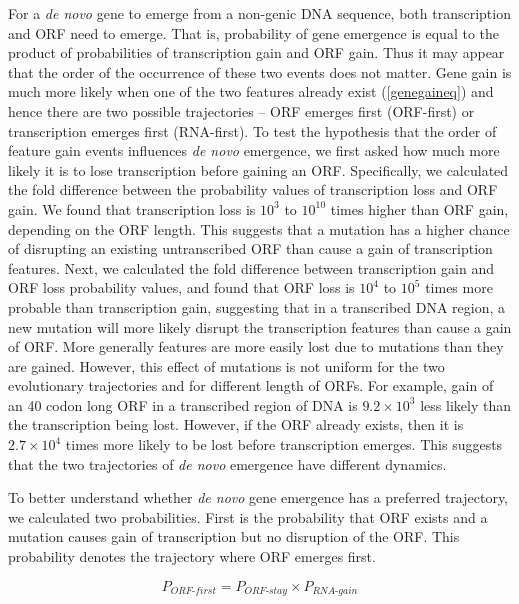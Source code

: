 \documentclass[12pt,a4paper]{article}
\begin{document}
For a \textit{de novo} gene to emerge from a non-genic DNA sequence, both transcription and ORF need to emerge. That is, probability of gene emergence is equal to the product of probabilities of transcription gain and ORF gain. Thus it may appear that the order of the occurrence of these two events does not matter. Gene gain is much more likely when one of the two features already exist (\autoref{genegaineq}) and hence there are two possible trajectories -- ORF emerges first (ORF-first) or transcription emerges first (RNA-first). To test the hypothesis that the order of feature gain events influences \textit{de novo} emergence, we first asked how much more likely it is to lose transcription before gaining an ORF. Specifically, we calculated the fold difference between the probability values of transcription loss and ORF gain. We found that transcription loss is $10^3$ to $10^{10}$ times higher than ORF gain, depending on the ORF length. This suggests that a mutation has a higher chance of disrupting an existing untranscribed ORF than cause a gain of transcription features. Next, we calculated the fold difference between transcription gain and ORF loss probability values, and found that ORF loss is $10^4$ to $10^5$ times more probable than transcription gain, suggesting that in a transcribed DNA region, a new mutation will more likely disrupt the transcription features than cause a gain of ORF. More generally features are more easily lost due to mutations than they are gained. However, this effect of mutations is not uniform for the two evolutionary trajectories and for different length of ORFs. For example, gain of an 40 codon long ORF in a transcribed region of DNA is $9.2\times10^3$ less likely than the transcription being lost. However, if the ORF already exists, then it is $2.7\times10^4$ times more likely to be lost before transcription emerges. This suggests that the two trajectories of \textit{de novo} emergence have different dynamics.

To better understand whether \textit{de novo} gene emergence has a preferred trajectory, we calculated two probabilities. First is the probability that ORF exists and a mutation causes gain of transcription but no disruption of the ORF. This probability denotes the trajectory where ORF emerges first. 

\begin{equation}
P_\textit{ORF-first} = P_\textit{ORF-stay}\times P_\textit{RNA-gain}
\label{orffirsteq1}
\end{equation}
\end{document}
